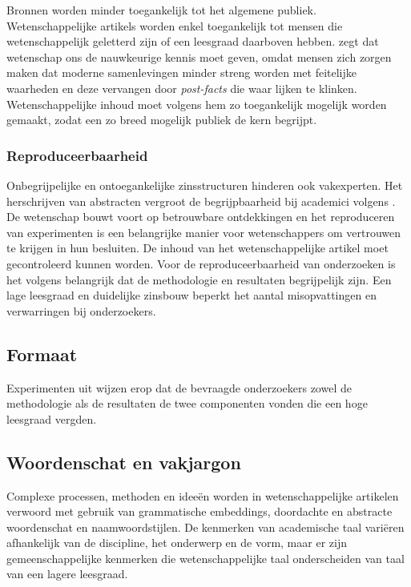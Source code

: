 Bronnen worden minder toegankelijk tot het algemene publiek. Wetenschappelijke artikels worden enkel toegankelijk tot mensen die wetenschappelijk geletterd zijn of een leesgraad daarboven hebben. \textcite{Ennals2010} zegt dat wetenschap ons de nauwkeurige kennis moet geven, omdat mensen zich zorgen maken dat moderne samenlevingen minder streng worden met feitelijke waarheden en deze vervangen door \textit{post-facts} die waar lijken te klinken. Wetenschappelijke inhoud moet volgens hem zo toegankelijk mogelijk worden gemaakt, zodat een zo breed mogelijk publiek de kern begrijpt.

\subsubsection{Reproduceerbaarheid}

Onbegrijpelijke en ontoegankelijke zinsstructuren hinderen ook vakexperten. Het herschrijven van abstracten vergroot de begrijpbaarheid bij academici volgens \textcite{Hartley1999, Snow2010}. De wetenschap bouwt voort op betrouwbare ontdekkingen en het reproduceren van experimenten is een belangrijke manier voor wetenschappers om vertrouwen te krijgen in hun besluiten. De inhoud van het wetenschappelijke artikel moet gecontroleerd kunnen worden. Voor de reproduceerbaarheid van onderzoeken is het volgens \textcite{McNutt2014} belangrijk dat de methodologie en resultaten begrijpelijk zijn. Een lage leesgraad en duidelijke zinsbouw beperkt het aantal misopvattingen en verwarringen bij onderzoekers.


\subsection{Formaat}

Experimenten uit \textcite{Hubbard2017} wijzen erop dat de bevraagde onderzoekers zowel de methodologie als de resultaten de twee componenten vonden die een hoge leesgraad vergden. 


\subsection{Woordenschat en vakjargon}

Complexe processen, methoden en ideeën worden in wetenschappelijke artikelen verwoord met gebruik van grammatische embeddings, doordachte en abstracte woordenschat en naamwoordstijlen. De kenmerken van academische taal variëren afhankelijk van de discipline, het onderwerp en de vorm, maar er zijn gemeenschappelijke kenmerken die wetenschappelijke taal onderscheiden van taal van een lagere leesgraad. \autocite{Ennals2010, Snow2010}

